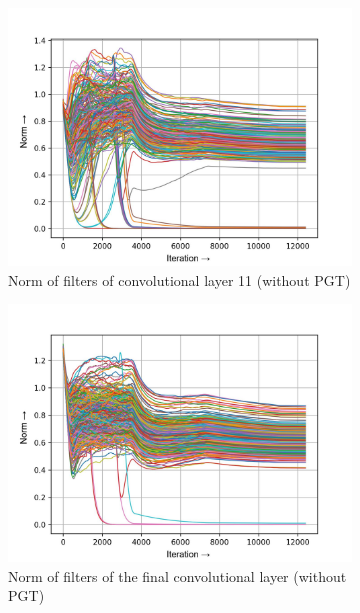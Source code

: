 \documentclass[times,sort&compress]{elsarticle}
\begin{document}
\begin{figure}[t]
\centering
\captionsetup{font=scriptsize}

\begin{subfigure}[t]{0.33\textwidth}
\includegraphics[width=\textwidth]{baseline-w-layer-4-2}
\caption{Norm of filters of convolutional layer 11 (without PGT)}
\end{subfigure}
\begin{subfigure}[t]{0.33\textwidth}
\includegraphics[width=\textwidth]{baseline-w-layer-7-2}
\caption{Norm of filters of the final convolutional layer (without PGT)}
\end{subfigure}
\begin{subfigure}[t]{0.33\textwidth}

\end{subfigure}
\end{figure}
\end{document}
